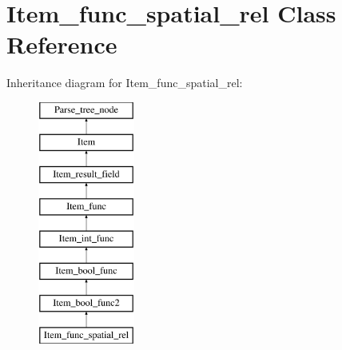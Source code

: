 \hypertarget{classItem__func__spatial__rel}{}\section{Item\+\_\+func\+\_\+spatial\+\_\+rel Class Reference}
\label{classItem__func__spatial__rel}
Inheritance diagram for Item\+\_\+func\+\_\+spatial\+\_\+rel\+:\begin{figure}[H]
\begin{center}
\leavevmode
\includegraphics[height=8.000000cm]{classItem__func__spatial__rel}
\end{center}
\end{figure}
